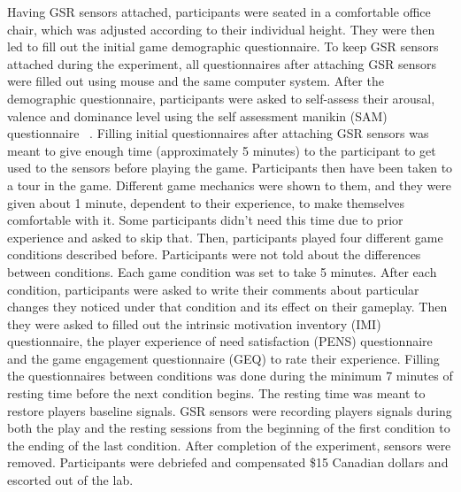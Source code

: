 Having GSR sensors attached, participants were seated in a comfortable office chair, which was adjusted according to their individual height. They were then led to fill out the initial game demographic questionnaire. To keep GSR sensors attached during the experiment, all questionnaires after attaching GSR sensors were filled out using mouse and the same computer system. After the demographic questionnaire, participants were asked to self-assess their arousal, valence and dominance level using the self assessment manikin (SAM) questionnaire ~\cite{?}. Filling initial questionnaires after attaching GSR sensors was meant to give enough time (approximately 5 minutes) to the participant to get used to the sensors before playing the game. Participants then have been taken to a tour in the game. Different game mechanics were shown to them, and they were given about 1 minute, dependent to their experience, to make themselves comfortable with it. Some participants didn't need this time due to prior experience and asked to skip that. Then, participants played four different game conditions described before. Participants were not told about the differences between conditions. Each game condition was set to take 5 minutes. After each condition, participants were asked to write their comments about particular changes they noticed under that condition and its effect on their gameplay. Then they were asked to filled out the intrinsic motivation inventory (IMI) questionnaire, the player experience of need satisfaction (PENS) questionnaire and the game engagement questionnaire (GEQ) to rate their experience. Filling the questionnaires between conditions was done during the minimum 7 minutes of resting time before the next condition begins. The resting time was meant to restore players baseline signals. GSR sensors were recording players signals during both the play and the resting sessions from the beginning of the first condition to the ending of the last condition. After completion of the experiment, sensors were removed. Participants were debriefed and compensated \$15 Canadian dollars and escorted out of the lab.

